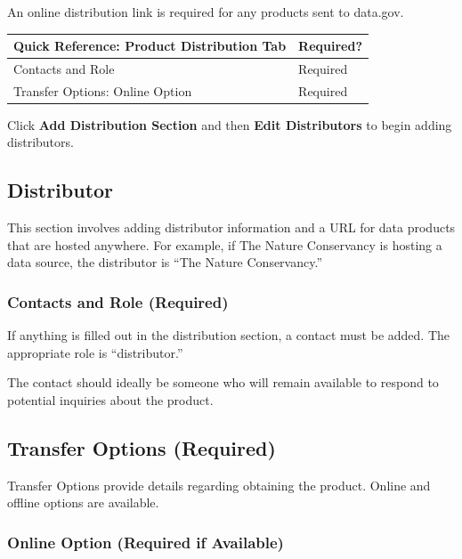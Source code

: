 \documentclass[
]{book}
\begin{document}
An online distribution link is required for any products sent to data.gov.

\begin{longtable}[]{@{}ll@{}}
\toprule
Quick Reference: Product Distribution Tab & Required?\tabularnewline
\midrule
\endhead
Contacts and Role & Required\tabularnewline
Transfer Options: Online Option & Required\tabularnewline
\bottomrule
\end{longtable}

Click \textbf{Add Distribution Section} and then \textbf{Edit Distributors} to begin adding distributors.

\hypertarget{distributor}{%
\subsection{Distributor}\label{distributor}}

This section involves adding distributor information and a URL for data products that are hosted anywhere. For example, if The Nature Conservancy is hosting a data source, the distributor is ``The Nature Conservancy.''

\hypertarget{contacts-and-role-required}{%
\subsubsection{Contacts and Role (Required)}\label{contacts-and-role-required}}

If anything is filled out in the distribution section, a contact must be added. The appropriate role is ``distributor.''

The contact should ideally be someone who will remain available to respond to potential inquiries about the product.

\hypertarget{transfer-options-required}{%
\subsection{Transfer Options (Required)}\label{transfer-options-required}}

Transfer Options provide details regarding obtaining the product. Online and offline options are available.

\hypertarget{online-option-required-if-available}{%
\subsubsection{Online Option (Required if Available)}\label{online-option-required-if-available}}
\end{document}
